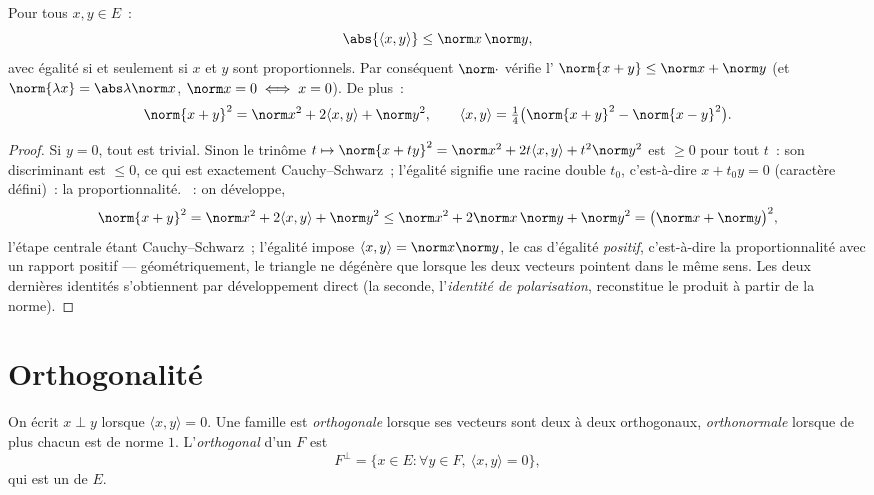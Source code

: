 \begin{theorem}\label{thm:b1:euclid:cs}
Pour tous $x, y \in E$~:
\[
\abs{\langle x, y\rangle} \leq \norm x\, \norm y ,
\]
avec égalité si et seulement si $x$ et $y$ sont proportionnels. Par
conséquent $\norm\cdot$ vérifie l' $\norm{x +
y} \leq \norm x + \norm y$ (et $\norm{\lambda x} = \abs\lambda
\norm x$, $\norm x = 0 \iff x = 0$). De plus~:
\[
\norm{x+y}^2 = \norm x^2 + 2\langle x, y\rangle + \norm y^2,
\qquad
\langle x, y \rangle = \tfrac14\bigl(\norm{x+y}^2 -
\norm{x-y}^2\bigr) .
\]
\end{theorem}

\begin{proof}
Si $y = 0$, tout est trivial. Sinon le trinôme $t \mapsto
\norm{x + ty}^2 = \norm x^2 + 2t\langle x, y\rangle + t^2
\norm y^2$ est $\geq 0$ pour tout $t$~: son discriminant est $\leq
0$, ce qui est exactement Cauchy--Schwarz~; l'égalité signifie une
racine double $t_0$, c'est-à-dire $x + t_0 y = 0$ (caractère
défini)~: la proportionnalité. ~: on
développe,
\[
\norm{x + y}^2 = \norm x^2 + 2\langle x, y\rangle + \norm y^2
\leq \norm x^2 + 2\norm x\,\norm y + \norm y^2
= \bigl(\norm x + \norm y\bigr)^2 ,
\]
l'étape centrale étant Cauchy--Schwarz~; l'égalité impose $\langle
x, y\rangle = \norm x\norm y$, le cas d'égalité \emph{positif},
c'est-à-dire la proportionnalité avec un rapport positif ---
géométriquement, le triangle ne dégénère que lorsque les deux
vecteurs pointent dans le même sens. Les deux dernières
identités s'obtiennent par développement direct (la seconde,
l'\emph{identité de polarisation}, reconstitue le produit à partir
de la norme).
\end{proof}

\section{Orthogonalité}

\begin{definition}\label{def:b1:euclid:orthogonal}
On écrit $x \perp y$ lorsque $\langle x, y \rangle = 0$. Une famille
est \emph{orthogonale} lorsque ses vecteurs sont deux à deux
orthogonaux, \emph{orthonormale}
lorsque de plus chacun est de norme $1$. L'\emph{orthogonal} d'un
 $F$ est
\[
F^{\perp} = \{x \in E : \forall y \in F,\ \langle x, y\rangle =
0\},
\]
qui est un  de $E$.
\end{definition}

